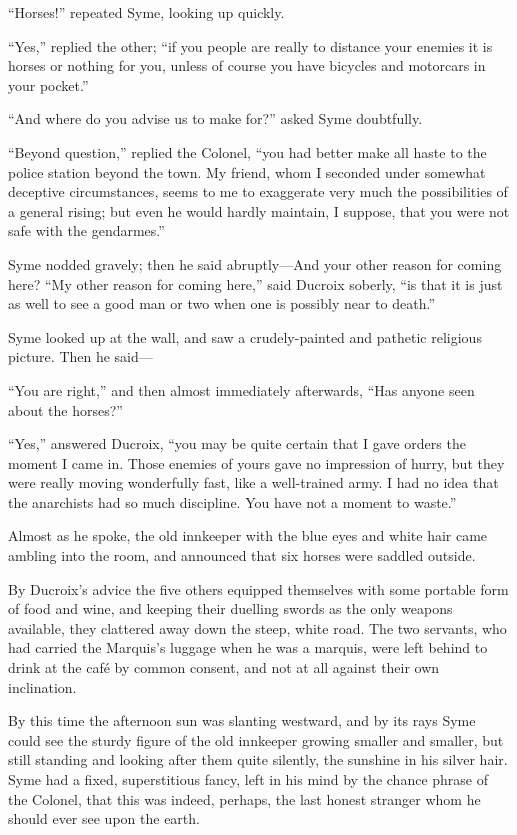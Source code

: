 \documentclass{book}
\begin{document}
“Horses!” repeated Syme, looking up quickly.

“Yes,” replied the other; “if you people are really to distance your enemies it is horses or nothing for you, unless of course you have bicycles and motorcars in your pocket.”

“And where do you advise us to make for?” asked Syme doubtfully.

“Beyond question,” replied the Colonel, “you had better make all haste to the police station beyond the town. My friend, whom I seconded under somewhat deceptive circumstances, seems to me to exaggerate very much the possibilities of a general rising; but even he would hardly maintain, I suppose, that you were not safe with the gendarmes.”

Syme nodded gravely; then he said abruptly—And your other reason for coming here? “My other reason for coming here,” said Ducroix soberly, “is that it is just as well to see a good man or two when one is possibly near to death.”

Syme looked up at the wall, and saw a crudely-painted and pathetic religious picture. Then he said—

“You are right,” and then almost immediately afterwards, “Has anyone seen about the horses?”

“Yes,” answered Ducroix, “you may be quite certain that I gave orders the moment I came in. Those enemies of yours gave no impression of hurry, but they were really moving wonderfully fast, like a well-trained army. I had no idea that the anarchists had so much discipline. You have not a moment to waste.”

Almost as he spoke, the old innkeeper with the blue eyes and white hair came ambling into the room, and announced that six horses were saddled outside.

By Ducroix’s advice the five others equipped themselves with some portable form of food and wine, and keeping their duelling swords as the only weapons available, they clattered away down the steep, white road. The two servants, who had carried the Marquis’s luggage when he was a marquis, were left behind to drink at the café by common consent, and not at all against their own inclination.

By this time the afternoon sun was slanting westward, and by its rays Syme could see the sturdy figure of the old innkeeper growing smaller and smaller, but still standing and looking after them quite silently, the sunshine in his silver hair. Syme had a fixed, superstitious fancy, left in his mind by the chance phrase of the Colonel, that this was indeed, perhaps, the last honest stranger whom he should ever see upon the earth.
\end{document}
